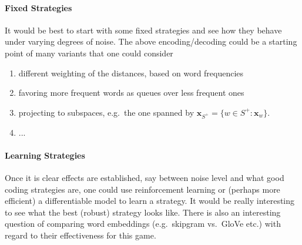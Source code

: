 \documentclass{article}
\newcommand{\x}{{\mathbf x}}
\begin{document}
\paragraph{Fixed Strategies} It would be best to start with some fixed strategies and see how they behave under varying degrees of noise. The above encoding/decoding could be a starting point of many variants that one could consider
\begin{enumerate}
\item different weighting of the distances, based on word frequencies
\item favoring more frequent words as queues over less frequent ones
\item projecting to subspaces, e.g.~the one spanned by $\x_{S^+} = \{ w \in S^+: \x_w\}$. 
\item ...
\end{enumerate}

\paragraph{Learning Strategies} Once it is clear effects are established, say between noise level and what good coding strategies are, one could use reinforcement learning or (perhaps more efficient) a differentiable model to learn a strategy. It would be really interesting to see what the best (robust) strategy looks like. There is also an interesting question of comparing word embeddings (e.g.~skipgram vs.~GloVe etc.) with regard to their effectiveness for this game.



\end{document}
